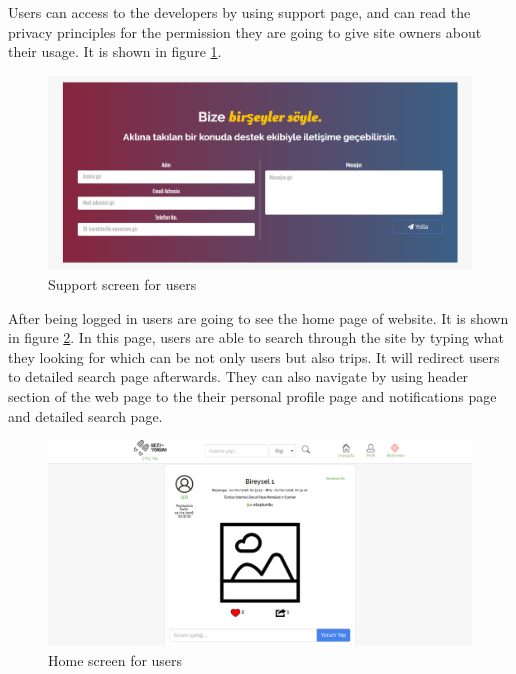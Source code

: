 \newpage

Users can access to the developers by using support page, and can read the privacy principles for the permission they are going to give site owners about their usage. It is shown in figure  \ref{fig:supportWeb}. 

\begin{figure}[!htbp]
\centering
\includegraphics[width=\textwidth]{projectChapters/images/supportPage.png}
\caption{Support screen for users}
\label{fig:supportWeb}
\end{figure}

\newpage

After being logged in users are going to see the home page of website.  It is shown in figure  \ref{fig:homepageWeb}. In this page, users are able to search through the site by typing what they looking for which can be not only users but also trips. It will redirect users to detailed search page afterwards. They can also navigate by using header section of the web page to the their personal profile page and notifications page and detailed search page.

\begin{figure}[!htbp]
\centering
\includegraphics[width=\textwidth]{projectChapters/images/homepageWeb.png}
\caption{Home screen for users}
\label{fig:homepageWeb}
\end{figure}

